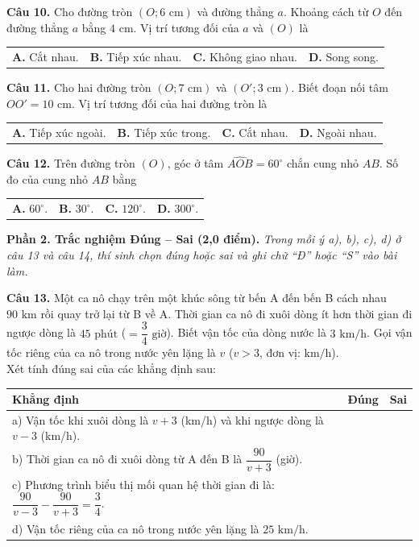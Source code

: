 \documentclass[11pt,a4paper]{article}
\begin{document}
\vspace{1.5mm}
\textbf{Câu 10.} Cho đường tròn $(O; 6\text{ cm})$ và đường thẳng $a$. Khoảng cách từ $O$ đến đường thẳng $a$ bằng $4\text{ cm}$. Vị trí tương đối của $a$ và $(O)$ là\\
\begin{tabularx}{\linewidth}{XXXX}
\textbf{A.} Cắt nhau. & \textbf{B.} Tiếp xúc nhau. & \textbf{C.} Không giao nhau. & \textbf{D.} Song song.
\end{tabularx}

\vspace{1.5mm}
\textbf{Câu 11.} Cho hai đường tròn $(O; 7\text{ cm})$ và $(O'; 3\text{ cm})$. Biết đoạn nối tâm $OO' = 10\text{ cm}$. Vị trí tương đối của hai đường tròn là\\
\begin{tabularx}{\linewidth}{XXXX}
\textbf{A.} Tiếp xúc ngoài. & \textbf{B.} Tiếp xúc trong. & \textbf{C.} Cắt nhau. & \textbf{D.} Ngoài nhau.
\end{tabularx}

\vspace{1.5mm}
\textbf{Câu 12.} Trên đường tròn $(O)$, góc ở tâm $\widehat{AOB} = 60^\circ$ chắn cung nhỏ $AB$. Số đo của cung nhỏ $AB$ bằng\\
\begin{tabularx}{\linewidth}{XXXX}
\textbf{A.} $60^\circ$. & \textbf{B.} $30^\circ$. & \textbf{C.} $120^\circ$. & \textbf{D.} $300^\circ$.
\end{tabularx}

\vspace{3mm}
\noindent
\textbf{Phần 2. Trắc nghiệm Đúng -- Sai (2,0 điểm).} \textit{Trong mỗi ý a), b), c), d) ở câu 13 và câu 14, thí sinh chọn đúng hoặc sai và ghi chữ ``Đ'' hoặc ``S'' vào bài làm.}

\vspace{1.5mm}
\textbf{Câu 13.} Một ca nô chạy trên một khúc sông từ bến A đến bến B cách nhau $90\text{ km}$ rồi quay trở lại từ B về A. Thời gian ca nô đi xuôi dòng ít hơn thời gian đi ngược dòng là $45\text{ phút}$ ($= \dfrac{3}{4}\text{ giờ}$). Biết vận tốc của dòng nước là $3\text{ km/h}$. Gọi vận tốc riêng của ca nô trong nước yên lặng là $v$ ($v > 3$, đơn vị: $\text{km/h}$).\\
Xét tính đúng sai của các khẳng định sau:
\begin{center}
\begin{tabularx}{\linewidth}{|X|c|c|}
\hline
\textbf{Khẳng định} & \textbf{Đúng} & \textbf{Sai} \\
\hline
a) Vận tốc khi xuôi dòng là $v + 3$ (km/h) và khi ngược dòng là $v - 3$ (km/h). & & \\
\hline
b) Thời gian ca nô đi xuôi dòng từ A đến B là $\dfrac{90}{v+3}$ (giờ). & & \\
\hline
c) Phương trình biểu thị mối quan hệ thời gian đi là: $\dfrac{90}{v-3} - \dfrac{90}{v+3} = \dfrac{3}{4}$. & & \\
\hline
d) Vận tốc riêng của ca nô trong nước yên lặng là $25\text{ km/h}$. & & \\
\hline
\end{tabularx}
\end{center}
\end{document}
